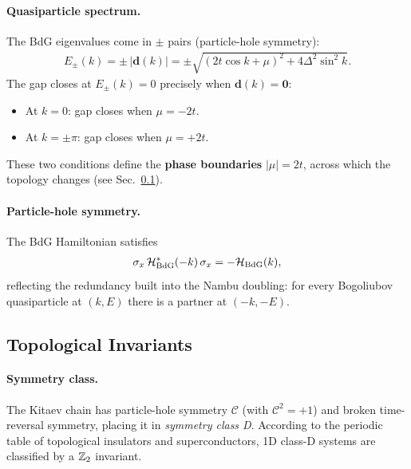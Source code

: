 \paragraph{Quasiparticle spectrum.}
The BdG eigenvalues come in $\pm$ pairs (particle-hole symmetry):
\begin{align}
    E_{\pm}(k) = \pm\,|\mathbf{d}(k)| = \pm\sqrt{(2t\cos k + \mu)^{2} + 4\Delta^{2}\sin^{2}k}.
    \label{eq:spectrum}
\end{align}
The gap closes at $E_\pm(k)=0$ precisely when $\mathbf{d}(k) = \mathbf{0}$:
\begin{itemize}
    \item At $k = 0$: gap closes when $\mu = -2t$.
    \item At $k = \pm\pi$: gap closes when $\mu = +2t$.
\end{itemize}
These two conditions define the \textbf{phase boundaries} $|\mu| = 2t$, across which the topology changes (see Sec.~\ref{sec:topinv}).

\paragraph{Particle-hole symmetry.}
The BdG Hamiltonian satisfies
\begin{align}
    \sigma_x\,\mathcal{H}_{\rm BdG}^{*}(-k)\,\sigma_x = -\mathcal{H}_{\rm BdG}(k),
\end{align}
reflecting the redundancy built into the Nambu doubling: for every Bogoliubov quasiparticle at $(k,E)$ there is a partner at $(-k,-E)$.

\subsection{Topological Invariants}
\label{sec:topinv}

\paragraph{Symmetry class.}
The Kitaev chain has particle-hole symmetry $\mathcal{C}$ (with $\mathcal{C}^2 = +1$) and broken time-reversal symmetry, placing it in \emph{symmetry class D}. According to the periodic table of topological insulators and superconductors, 1D class-D systems are classified by a $\mathbb{Z}_2$ invariant.

